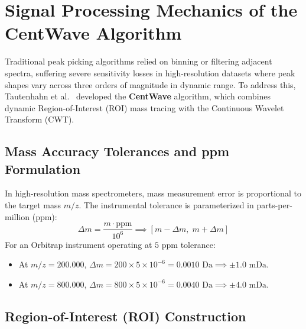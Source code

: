 \documentclass[11pt,twoside,openright]{book}
\begin{document}
\section{Signal Processing Mechanics of the CentWave Algorithm}

Traditional peak picking algorithms relied on binning or filtering adjacent spectra, suffering severe sensitivity losses in high-resolution datasets where peak shapes vary across three orders of magnitude in dynamic range. To address this, Tautenhahn et al.~\cite{tautenhahn2008highly} developed the \textbf{CentWave} algorithm, which combines dynamic Region-of-Interest (ROI) mass tracing with the Continuous Wavelet Transform (CWT).

\subsection{Mass Accuracy Tolerances and ppm Formulation}

In high-resolution mass spectrometers, mass measurement error is proportional to the target mass $m/z$. The instrumental tolerance is parameterized in parts-per-million ($\text{ppm}$):
\begin{equation}
\label{eq:ppm_def}
\Delta m = \frac{m \cdot \text{ppm}}{10^6} \implies [m - \Delta m, \; m + \Delta m]
\end{equation}
For an Orbitrap instrument operating at $5\text{ ppm}$ tolerance:
\begin{itemize}
    \item At $m/z = 200.000$, $\Delta m = 200 \times 5 \times 10^{-6} = 0.0010\text{ Da} \implies \pm 1.0\text{ mDa}$.
    \item At $m/z = 800.000$, $\Delta m = 800 \times 5 \times 10^{-6} = 0.0040\text{ Da} \implies \pm 4.0\text{ mDa}$.
\end{itemize}

\subsection{Region-of-Interest (ROI) Construction}
\end{document}
